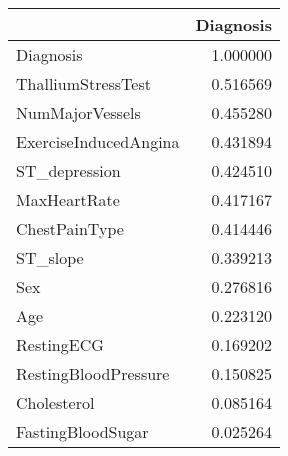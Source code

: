 \begin{tabular}{lr}
\toprule
{} &  Diagnosis \\
\midrule
Diagnosis             &   1.000000 \\
ThalliumStressTest    &   0.516569 \\
NumMajorVessels       &   0.455280 \\
ExerciseInducedAngina &   0.431894 \\
ST\_depression         &   0.424510 \\
MaxHeartRate          &   0.417167 \\
ChestPainType         &   0.414446 \\
ST\_slope              &   0.339213 \\
Sex                   &   0.276816 \\
Age                   &   0.223120 \\
RestingECG            &   0.169202 \\
RestingBloodPressure  &   0.150825 \\
Cholesterol           &   0.085164 \\
FastingBloodSugar     &   0.025264 \\
\bottomrule
\end{tabular}
